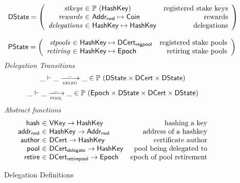 \documentclass[11pt,a4paper]{article}
\newcommand{\powerset}[1]{\mathbb{P}~#1}
\newcommand{\var}[1]{\mathit{#1}}
\newcommand{\fun}[1]{\mathsf{#1}}
\newcommand{\type}[1]{\mathsf{#1}}
\newcommand{\trans}[2]{\xlongrightarrow[\textsc{#1}]{#2}}
\newcommand{\AddrRWD}{\type{Addr_{rwd}}}
\newcommand{\VKey}{\type{VKey}}
\newcommand{\HashKey}{\type{HashKey}}
\newcommand{\Coin}{\type{Coin}}
\newcommand{\Epoch}{\type{Epoch}}
\newcommand{\DState}{\type{DState}}
\newcommand{\PState}{\type{PState}}
\newcommand{\DCert}{\type{DCert}}
\newcommand{\DCertDeleg}{\type{DCert_{delegate}}}
\newcommand{\DCertRegPool}{\type{DCert_{regpool}}}
\newcommand{\DCertRetirePool}{\type{DCert_{retirepool}}}
\begin{document}
\begin{figure}
\begin{equation*}
\begin{array}{l}
    \DState =
    \left(\begin{array}{r@{~\in~}lr}
      \var{stkeys} & \powerset (\HashKey) & \text{registered stake keys}\\
      \var{rewards} & \AddrRWD \mapsto \Coin & \text{rewards}\\
      \var{delegations} & \HashKey \mapsto \HashKey & \text{delegations}\\
    \end{array}\right)
    \\
    \\
    \PState =
    \left(\begin{array}{r@{~\in~}lr}
      \var{stpools} & \HashKey \mapsto \DCertRegPool & \text{registered stake pools}\\
      \var{retiring} & \HashKey \mapsto \Epoch & \text{retiring stake pools}\\
    \end{array}\right)
    \end{array}
  \end{equation*}
  \emph{Delegation Transitions}
  \begin{equation*}
    \_ \vdash \_ \trans{deleg}{\_} \_ \in
      \powerset (\DState \times \DCert \times \DState)
  \end{equation*}
  \begin{equation*}
    \_ \vdash \_ \trans{pool}{\_} \_ \in
      \powerset (\Epoch \times \DState \times \DCert \times \DState)
  \end{equation*}
  \emph{Abstract functions}
  \begin{equation*}
  \begin{array}{r@{~\in~}lr}
  \fun{hash} & \VKey \to \HashKey
  & \text{hashing a key}
  \\
  \fun{addr_{rwd}} & \HashKey \to \AddrRWD
  & \text{address of a hashkey}
  \\
  \fun{author} & \DCert \to \HashKey
  & \text{certificate author}
  \\
  \fun{pool} & \DCertDeleg \to \HashKey
  & \text{pool being delegated to}
  \\
  \fun{retire} & \DCertRetirePool \to \Epoch
  & \text{epoch of pool retirement}
  \end{array}
  \end{equation*}
  
  \caption{Delegation Definitions}
  \label{fig:delegation-definitons}
\end{figure}
\end{document}
